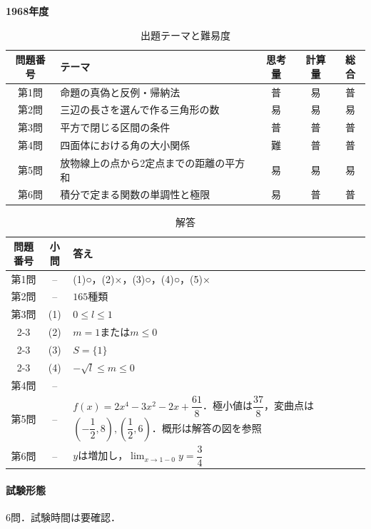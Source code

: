 \documentclass[../../main.tex]{subfiles}
\begin{document}
\begin{center}
  {\fontsize{48pt}{58pt}\selectfont \textbf{1968}\normalsize\textbf{年度}}
\end{center}

\begin{table}[htb]
  \centering
  \caption{出題テーマと難易度}
  \begin{tabular}{|c|p{6.2cm}|c|c|c|}
    \hline
    \textbf{問題番号} & \textbf{テーマ} & \textbf{思考量} & \textbf{計算量} & \textbf{総合} \\
    \hline
    第1問 & 命題の真偽と反例・帰納法 & 普 & 易 & 普 \\
    \hline
    第2問 & 三辺の長さを選んで作る三角形の数 & 易 & 易 & 易 \\
    \hline
    第3問 & 平方で閉じる区間の条件 & 普 & 普 & 普 \\
    \hline
    第4問 & 四面体における角の大小関係 & 難 & 普 & 普 \\
    \hline
    第5問 & 放物線上の点から2定点までの距離の平方和 & 易 & 易 & 易 \\
    \hline
    第6問 & 積分で定まる関数の単調性と極限 & 易 & 普 & 普 \\
    \hline
  \end{tabular}
\end{table}

\begin{table}[htb]
  \centering
  \caption{解答}
  \renewcommand{\arraystretch}{1.4}
  \begin{tabular}{|c|c|p{9cm}|}
    \hline
    \textbf{問題番号} & \textbf{小問} & \textbf{答え} \\
    \hline
    第1問 & -- & (1)○，(2)×，(3)○，(4)○，(5)× \\
    \hline
    第2問 & -- & $165$種類 \\
    \hline
    第3問 & (1) & $0\le l\le1$ \\
    \cline{2-3}
    & (2) & $m=1$または$m\le0$ \\
    \cline{2-3}
    & (3) & $S=\{1\}$ \\
    \cline{2-3}
    & (4) & $-\sqrt{l}\le m\le0$ \\
    \hline
    第4問 & -- &  \\
    \hline
    第5問 & -- & $f(x)=2x^4-3x^2-2x+\dfrac{61}{8}$．極小値は$\dfrac{37}{8}$，変曲点は$(-\dfrac{1}{2},8),(\dfrac{1}{2},6)$．概形は解答の図を参照 \\
    \hline
    第6問 & -- & $y$は増加し，$\displaystyle\lim_{x\to1-0}y=\dfrac{3}{4}$ \\
    \hline
  \end{tabular}
\end{table}

\paragraph{試験形態}
6問．試験時間は要確認．
\end{document}
